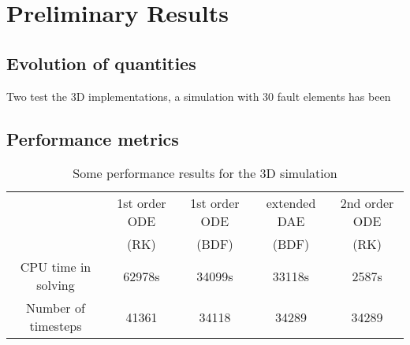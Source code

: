 \section{Preliminary Results}
\subsection{Evolution of quantities}
Two test the 3D implementations, a simulation with 30 fault elements has been 


\subsection{Performance metrics}

\begin{table}[H]
	\centering 
	\begin{tabular}{ | c | c c c c |}
		\hline	
		& 1st order ODE 	& 1st order ODE 	& extended DAE  & 2nd order ODE  	\\ 
		& (RK)				& (BDF) 			&  (BDF) 		& (RK) 		  	 	\\ \hline
		CPU time in solving
		& 62978s 			& 34099s			& 33118s 		& 2587s			  	\\  
		Number of timesteps 	
		& 41361 		 	& 34118			 	& 34289			& 34289				\\\hline
	\end{tabular}
	\caption{Some performance results for the 3D simulation}
	\label{tab:performance_3D}
\end{table}






